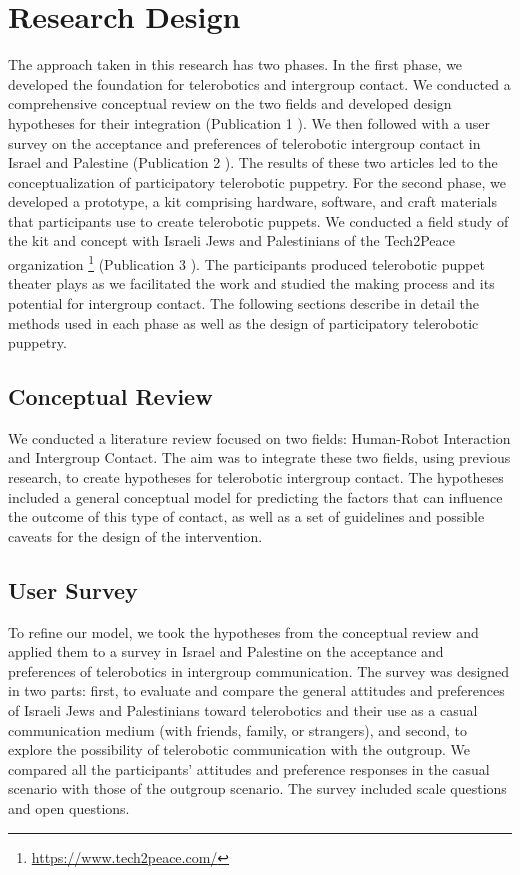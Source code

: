 \documentclass[dissertation,math,vertlayout,pdfa,colorlinks,nologo]{aaltoseries}
\begin{document}

\chapter{Research Design}
The approach taken in this research has two phases. In the first phase, we developed the foundation for telerobotics and intergroup contact. We conducted a comprehensive conceptual review on the two fields and developed design hypotheses for their integration (Publication 1 \cite{peledTelerobotContactHypothesis2022}). We then followed with a user survey on the acceptance and preferences of telerobotic intergroup contact in Israel and Palestine (Publication 2 \cite{peledTeleroboticIntergroupContact2024}). The results of these two articles led to the conceptualization of participatory telerobotic puppetry. For the second phase, we developed a prototype, a kit comprising hardware, software, and craft materials that participants use to create telerobotic puppets. We conducted a field study of the kit and concept with Israeli Jews and Palestinians of the Tech2Peace organization \footnote{\url{https://www.tech2peace.com/}} (Publication 3 \cite{peledTeleroboticTheaterOppressed2025}). The participants produced telerobotic puppet theater plays as we facilitated the work and studied the making process and its potential for intergroup contact. The following sections describe in detail the methods used in each phase as well as the design of participatory telerobotic puppetry.

\section{Conceptual Review}
We conducted a literature review focused on two fields: Human-Robot Interaction and Intergroup Contact. The aim was to integrate these two fields, using previous research, to create hypotheses for telerobotic intergroup contact. The hypotheses included a general conceptual model for predicting the factors that can influence the outcome of this type of contact, as well as a set of guidelines and possible caveats for the design of the intervention.
\section{User Survey}
To refine our model, we took the hypotheses from the conceptual review and applied them to a survey in Israel and Palestine on the acceptance and preferences of telerobotics in intergroup communication. The survey was designed in two parts: first, to evaluate and compare the general attitudes and preferences of Israeli Jews and Palestinians toward telerobotics and their use as a casual communication medium (with friends, family, or strangers), and second, to explore the possibility of telerobotic communication with the outgroup. We compared all the participants' attitudes and preference responses in the casual scenario with those of the outgroup scenario. The survey included scale questions and open questions.
\end{document}
